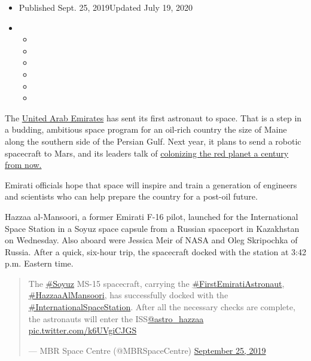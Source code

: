 \begin{itemize}
\item
  Published Sept. 25, 2019Updated July 19, 2020
\item
  \begin{itemize}
  \item
  \item
  \item
  \item
  \item
  \item
  \end{itemize}
\end{itemize}

The
\href{https://www.nytimes3xbfgragh.onion/2020/07/14/science/mars-united-arab-emirates.html}{United
Arab Emirates} has sent its first astronaut to space. That is a step in
a budding, ambitious space program for an oil-rich country the size of
Maine along the southern side of the Persian Gulf. Next year, it plans
to send a robotic spacecraft to Mars, and its leaders talk of
\href{https://government.ae/en/more/uae-future/2030-2117}{colonizing the
red planet a century from now.}

Emirati officials hope that space will inspire and train a generation of
engineers and scientists who can help prepare the country for a post-oil
future.

Hazzaa al-Mansoori, a former Emirati F-16 pilot, launched for the
International Space Station in a Soyuz space capsule from a Russian
spaceport in Kazakhstan on Wednesday. Also aboard were Jessica Meir of
NASA and Oleg Skripochka of Russia. After a quick, six-hour trip, the
spacecraft docked with the station at 3:42 p.m. Eastern time.

\begin{quote}
The
\href{https://twitter.com/hashtag/Soyuz?src=hash\&ref_src=twsrc\%5Etfw}{\#Soyuz}
MS-15 spacecraft, carrying the
\href{https://twitter.com/hashtag/FirstEmiratiAstronaut?src=hash\&ref_src=twsrc\%5Etfw}{\#FirstEmiratiAstronaut},
\href{https://twitter.com/hashtag/HazzaaAlMansoori?src=hash\&ref_src=twsrc\%5Etfw}{\#HazzaaAlMansoori},
has successfully docked with the
\href{https://twitter.com/hashtag/InternationalSpaceStation?src=hash\&ref_src=twsrc\%5Etfw}{\#InternationalSpaceStation}.
After all the necessary checks are complete, the astronauts will enter
the
ISS\href{https://twitter.com/astro_hazzaa?ref_src=twsrc\%5Etfw}{@astro\_hazzaa}
\href{https://t.co/k6UVgiCJGS}{pic.twitter.com/k6UVgiCJGS}

--- MBR Space Centre (@MBRSpaceCentre)
\href{https://twitter.com/MBRSpaceCentre/status/1176946873531285504?ref_src=twsrc\%5Etfw}{September
25, 2019}
\end{quote}

